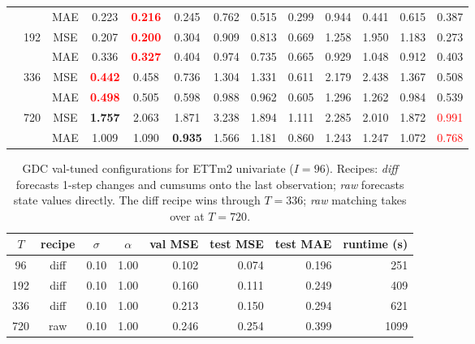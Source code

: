 \begin{table}[t]
{\begin{tabular}{c c c||c|c|c|c||c|c|c|c|c|c}
  &                      & MAE & 0.223 & \textbf{\textcolor{red}{0.216}} & 0.245 & 0.762 & 0.515 & 0.299 & 0.944 & 0.441 & 0.615 & 0.387 \\
  & \multirow{2}{*}{192} & MSE & 0.207 & \textbf{\textcolor{red}{0.200}} & 0.304 & 0.909 & 0.813 & 0.669 & 1.258 & 1.950 & 1.183 & 0.273 \\
  &                      & MAE & 0.336 & \textbf{\textcolor{red}{0.327}} & 0.404 & 0.974 & 0.735 & 0.665 & 0.929 & 1.048 & 0.912 & 0.403 \\
  & \multirow{2}{*}{336} & MSE & \textbf{\textcolor{red}{0.442}} & 0.458 & 0.736 & 1.304 & 1.331 & 0.611 & 2.179 & 2.438 & 1.367 & 0.508 \\
  &                      & MAE & \textbf{\textcolor{red}{0.498}} & 0.505 & 0.598 & 0.988 & 0.962 & 0.605 & 1.296 & 1.262 & 0.984 & 0.539 \\
  & \multirow{2}{*}{720} & MSE & \textbf{1.757} & 2.063 & 1.871 & 3.238 & 1.894 & 1.111 & 2.285 & 2.010 & 1.872 & \textcolor{red}{0.991} \\
  &                      & MAE & 1.009 & 1.090 & \textbf{0.935} & 1.566 & 1.181 & 0.860 & 1.243 & 1.247 & 1.072 & \textcolor{red}{0.768} \\
\bottomrule
\end{tabular}}
\end{table}


\begin{table}[t]
\centering
\caption{GDC val-tuned configurations for ETTm2 univariate ($I=96$). Recipes: \emph{diff} forecasts 1-step changes and cumsums onto the last observation; \emph{raw} forecasts state values directly. The diff recipe wins through $T=336$; \emph{raw} matching takes over at $T=720$.}
\label{tab:ettm2_picks}
\begin{tabular}{c c c c r r r r}
\toprule
$T$ & recipe & $\sigma$ & $\alpha$ & val MSE & test MSE & test MAE & runtime (s) \\
\midrule
 96 & diff & 0.10 & 1.00 & 0.102 & 0.074 & 0.196 &  251 \\
192 & diff & 0.10 & 1.00 & 0.160 & 0.111 & 0.249 &  409 \\
336 & diff & 0.10 & 1.00 & 0.213 & 0.150 & 0.294 &  621 \\
720 & raw  & 0.10 & 1.00 & 0.246 & 0.254 & 0.399 & 1099 \\
\bottomrule
\end{tabular}
\end{table}


